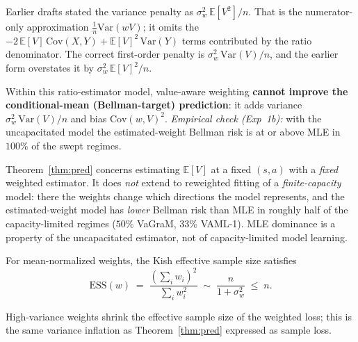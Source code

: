 \documentclass{article}
\theoremstyle{plain}
\begin{document}
\begin{remark}[correction]
Earlier drafts stated the variance penalty as $\sigma_w^2\,\mathbb{E}[V^2]/n$. That is
the numerator-only approximation $\frac{1}{n}\mathrm{Var}(wV)$; it omits the
$-2\,\mathbb{E}[V]\,\mathrm{Cov}(X,Y) + \mathbb{E}[V]^2\,\mathrm{Var}(Y)$ terms
contributed by the ratio denominator. The correct first-order penalty is
$\sigma_w^2\,\mathrm{Var}(V)/n$, and the earlier form overstates it by
$\sigma_w^2\,\mathbb{E}[V]^2/n$.
\end{remark}

Within this ratio-estimator model, value-aware weighting \textbf{cannot improve the
conditional-mean (Bellman-target) prediction}: it adds variance
$\sigma_w^2\,\mathrm{Var}(V)/n$ and bias $\mathrm{Cov}(w,V)^2$. \emph{Empirical check
(Exp~1b):} with the uncapacitated model the estimated-weight Bellman risk is at or above
MLE in $100\%$ of the swept regimes.

\begin{remark}
\label{rem:scope}
Theorem~\ref{thm:pred} concerns estimating $\mathbb{E}[V]$ at a fixed $(s,a)$ with a
\emph{fixed} weighted estimator. It does \emph{not} extend to reweighted fitting of a
\emph{finite-capacity} model: there the weights change which directions the model
represents, and the estimated-weight model has \emph{lower} Bellman risk than MLE in
roughly half of the capacity-limited regimes ($50\%$ VaGraM, $33\%$ VAML-1). MLE
dominance is a property of the uncapacitated estimator, not of capacity-limited model
learning.
\end{remark}

\begin{theorem}
\label{thm:ess}
For mean-normalized weights, the Kish effective sample size satisfies
\begin{equation}
  \mathrm{ESS}(w) \;=\; \frac{\left(\sum_i w_i\right)^2}{\sum_i w_i^2}
  \;\sim\; \frac{n}{1 + \sigma_w^2} \;\le\; n.
\end{equation}
\end{theorem}

High-variance weights shrink the effective sample size of the weighted loss; this is the
same variance inflation as Theorem~\ref{thm:pred} expressed as sample loss.
\end{document}
